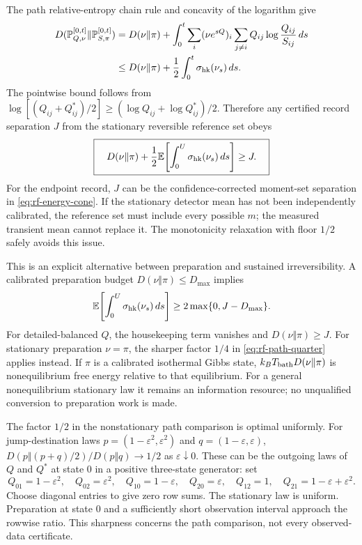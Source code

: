The path relative-entropy chain rule and concavity of the logarithm give
\begin{align}
 D(\mathbb P_{Q,\nu}^{[0,t]}\Vert\mathbb P_{S,\pi}^{[0,t]})
 &=D(\nu\Vert\pi)+\int_0^t\sum_i(\nu e^{sQ})_i
     \sum_{j\ne i}Q_{ij}\log\frac{Q_{ij}}{S_{ij}}\,ds\\
 &\le D(\nu\Vert\pi)+\frac12\int_0^t\sigma_{\rm hk}(\nu_s)\,ds.
 \label{eq:rf-transient-resource}
\end{align}
The pointwise bound follows from
$\log[(Q_{ij}+Q^*_{ij})/2]\ge
(\log Q_{ij}+\log Q^*_{ij})/2$. Therefore any certified record separation
$J$ from the stationary reversible reference set obeys
\begin{equation}
 \boxed{\quad D(\nu\Vert\pi)
 +\frac12\mathbb E\!\left[\int_0^U\sigma_{\rm hk}(\nu_s)\,ds\right]
 \ge J.\quad}
 \label{eq:rf-preparation-housekeeping}
\end{equation}
For the endpoint record, $J$ can be the confidence-corrected moment-set
separation in \eqref{eq:rf-energy-cone}. If the stationary detector mean has
not been independently calibrated, the reference set must include every
possible $m$; the measured transient mean cannot replace it. The monotonicity
relaxation with floor $1/2$ safely avoids this issue.

This is an explicit alternative between preparation and sustained
irreversibility. A calibrated preparation budget
$D(\nu\Vert\pi)\le D_{\max}$ implies
\begin{equation}
 \mathbb E\!\left[\int_0^U\sigma_{\rm hk}(\nu_s)\,ds\right]
 \ge 2\max\{0,J-D_{\max}\}.
\end{equation}
For detailed-balanced $Q$, the housekeeping term vanishes and
$D(\nu\Vert\pi)\ge J$. For stationary preparation $\nu=\pi$, the sharper
factor $1/4$ in \eqref{eq:rf-path-quarter} applies instead. If $\pi$ is a
calibrated isothermal Gibbs state, $k_BT_{\rm bath}D(\nu\Vert\pi)$ is
nonequilibrium free energy relative to that equilibrium. For a general
nonequilibrium stationary law it remains an information resource; no
unqualified conversion to preparation work is made.

The factor $1/2$ in the nonstationary path comparison is optimal uniformly.
For jump-destination laws
$p=(1-\varepsilon^2,\varepsilon^2)$ and
$q=(1-\varepsilon,\varepsilon)$,
$D(p\Vert(p+q)/2)/D(p\Vert q)\to1/2$ as $\varepsilon\downarrow0$.
These can be the outgoing laws of $Q$ and $Q^*$ at state $0$ in a positive
three-state generator: set
\[
 Q_{01}=1-\varepsilon^2,\quad Q_{02}=\varepsilon^2,\quad
 Q_{10}=1-\varepsilon,\quad Q_{20}=\varepsilon,\quad
 Q_{12}=1,\quad Q_{21}=1-\varepsilon+\varepsilon^2.
\]
Choose diagonal entries to give zero row sums. The stationary law is uniform.
Preparation at state $0$ and a sufficiently short observation interval
approach the rowwise ratio. This sharpness concerns the path comparison,
not every observed-data certificate.

